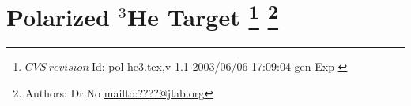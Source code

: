 \section{Polarized $^3$He Target
\footnote{
  $CVS~revision~ $Id: pol-he3.tex,v 1.1 2003/06/06 17:09:04 gen Exp $ $
}
\footnote{Authors: Dr.No \url{mailto:????@jlab.org}}
}
%
%
%
